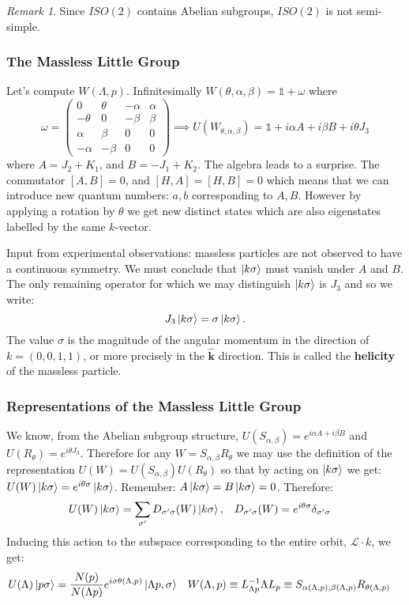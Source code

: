\documentclass[10pt]{article}
\newcommand{\iden}{\mathds{1}}
\newcommand{\ms}{\mathscr}
\newcommand{\sg}{\sigma}
\newcommand{\FR}[2]{\frac{#1}{#2}}
\theoremstyle{plain}
\theoremstyle{definition}
\theoremstyle{remark}
\newtheorem*{remark}{Remark}
\newcommand{\om}{\omega}
\begin{document}
\begin{remark}
Since $ISO(2)$ contains Abelian subgroups, $ISO(2)$ is not semi-simple.
\end{remark}

\subsubsection{The Massless Little Group}
Let's compute $W(\Lambda,p)$. Infinitesimally $W(\theta,\alpha,\beta)
= \iden + \om$ where 
\[ \om = 
    \left( \begin{smallmatrix}
        0 &  \theta & -\alpha & \alpha \\
  -\theta &    0    & -\beta  & \beta  \\
   \alpha &  \beta  &  0 & 0\\
  -\alpha & -\beta  &  0 & 0
   \end{smallmatrix} \right)
   \implies 
   U(W_{\theta,\alpha,\beta}) = \iden + i\alpha A + i\beta B + i\theta
   J_3
\]
where $A = J_2+K_1$, and $B = -J_1+K_2$. The algebra leads to a
surprise. The commutator $[A,B]=0$, and $[H,A]=[H,B]=0$ which means
that we can introduce new quantum numbers: $a,b$ corresponding to
$A,B$. However by applying a rotation by $\theta$ we get new distinct
states which are also eigenstates labelled by the same $k$-vector.

Input from experimental observations: massless particles are not
observed to have a continuous symmetry. We must conclude that
$\ket{k\sg}$ must vanish under $A$ and $B$. The only remaining
operator for which we may distinguish $\ket{k\sg}$ is $J_3$ and so we
write: \[ J_3\ket{k\sg} = \sg\ket{k\sg}. \]
The value $\sg$ is the magnitude of the angular momentum in the
direction of $k=(0,0,1,1)$, or more precisely in the $\bm {\hat k}$
direction. This is called the \textbf{helicity} of the massless
particle.

\subsubsection{Representations of the Massless Little Group}
We know, from the Abelian subgroup structure, $U(S_{\alpha,\beta})
= e^{i\alpha A + i\beta B}$ and $U(R_\theta) = e^{i\theta J_3}$.
Therefore for any $W=S_{\alpha,\beta}R_\theta$ we may use the
definition of the representation $U(W) = U(S_{\alpha,\beta})
U(R_\theta)$ so that by acting on $\ket{k\sg}$ we get: $U(W)
\ket{k\sg}=e^{i\theta\sg}\ket{k\sg}$. Remember: $A\ket{k\sg} =
B\ket{k\sg}=0$. Therefore:
\begin{align*}
    U(W)\ket{k\sg} &= \sum_{\sg'} D_{\sg'\sg}(W)\ket{k\sg},  &
    D_{\sg'\sg}(W) &= e^{i\theta\sg}\delta_{\sg'\sg}
\end{align*}
Inducing this action to the subspace corresponding to the entire
orbit, $\ms L \cdot k$, we get:
\begin{align*}
    U(\Lambda)\ket{p\sg} &= \FR{N(p)}{N(\Lambda p)} %
    e^{i\sg\theta(\Lambda,p)}\ket{\Lambda p,\sg} &
    W(\Lambda,p)&\equiv L^{-1}_{\Lambda p}\Lambda L_p \equiv
    S_{\alpha(\Lambda,p),\beta(\Lambda,p)}R_{\theta(\Lambda,p)}
\end{align*}
\end{document}
